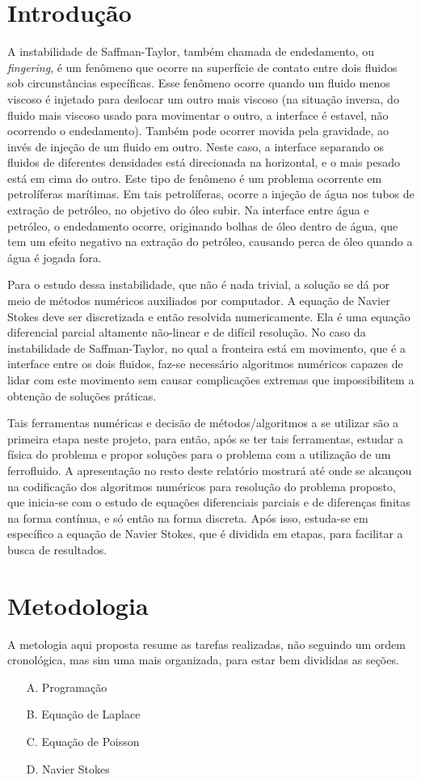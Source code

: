 \documentclass[journal]{IEEEtran}
\begin{document}
\section{Introdução}
A instabilidade de Saffman-Taylor, também chamada de endedamento, ou \textit{fingering}, é um fenômeno que ocorre na superfície de contato entre dois fluidos sob circunstâncias específicas. Esse fenômeno ocorre quando um fluido menos viscoso é injetado para deslocar um outro mais viscoso (na situação inversa, do fluido mais viscoso usado para movimentar o outro, a interface é estavel, não ocorrendo o endedamento). Também pode ocorrer movida pela gravidade, ao invés de injeção de um fluido em outro. Neste caso, a interface separando os fluidos de diferentes densidades está direcionada na horizontal, e o mais pesado está em cima do outro. Este tipo de fenômeno é um problema ocorrente em petrolíferas marítimas. Em tais petrolíferas, ocorre a injeção de água nos tubos de extração de petróleo, no objetivo do óleo subir. Na interface entre água e petróleo, o endedamento ocorre, originando bolhas de óleo dentro de água, que tem um efeito negativo na extração do petróleo, causando perca de óleo quando a água é jogada fora.

Para o estudo dessa instabilidade, que não é nada trivial, a solução se dá por meio de métodos numéricos auxiliados por computador. A equação de Navier Stokes deve ser discretizada e então resolvida numericamente. Ela é uma equação diferencial parcial altamente não-linear e de difícil resolução. No caso da instabilidade de Saffman-Taylor, no qual a fronteira está em movimento, que é a interface entre os dois fluidos, faz-se necessário algoritmos numéricos capazes de lidar com este movimento sem causar complicações extremas que impossibilitem a obtenção de soluções práticas. 

Tais ferramentas numéricas e decisão de métodos/algoritmos a se utilizar são a primeira etapa neste projeto, para então, após se ter tais ferramentas, estudar a física do problema e propor soluções para o problema com a utilização de um ferrofluido. A apresentação no resto deste relatório mostrará até onde se alcançou na codificação dos algoritmos numéricos para resolução do problema proposto, que inicia-se com o estudo de equações diferenciais parciais e de diferenças finitas na forma contínua, e só então na forma discreta. Após isso, estuda-se em específico a equação de Navier Stokes, que é dividida em etapas, para facilitar a busca de resultados.
\section{Metodologia}
A metologia aqui proposta resume as tarefas realizadas, não seguindo um ordem cronológica, mas sim uma mais organizada, para estar bem divididas as seções.
\begin{enumerate}
  \item[A.] Programação
  \item[B.] Equação de Laplace
  \item[C.] Equação de Poisson
  \item[D.] Navier Stokes
\end{enumerate}
\end{document}
